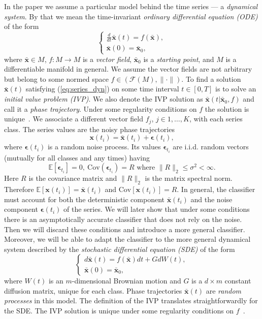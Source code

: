 \documentclass[referee, pdflatex, sn-mathphys-num]{sn-jnl}
\theoremstyle{definition}
\theoremstyle{plain}
\newcommand{\bx}{\ensuremath{\mathbf{x}}}
\newcommand{\bbx}{\ensuremath{\bar{\mathbf{x}}}}
\newcommand{\beps}{\ensuremath{\boldsymbol{\epsilon}}}
\begin{document}
	In the paper we assume a particular model behind the time series --- a \emph{dynamical system}. By that we mean the time-invariant \emph{ordinary differential equation (ODE)} of the form
	\begin{equation}\label{eq:series_dyn}
		\begin{cases}
			\frac{d}{dt} \bbx(t) = f(\bbx), \\
			\bbx(0) = \bbx_0,
		\end{cases}
	\end{equation}
	where $\bbx \in M$, $f: M \to M$ is a \textit{vector field}, $\bbx_0$ is a \textit{starting point}, and $M$ is a differentiable manifold in general. We assume the vector fields are not arbitrary but belong to some normed space $f \in (\mathcal{F}(M), \lVert \cdot \rVert)$. To find a solution $\bbx(t)$ satisfying (\ref{eq:series_dyn}) on some time interval $t \in [0, T]$ is to solve an \emph{initial value problem (IVP)}. We also denote the IVP solution as $\bbx(t | \bbx_0, f)$ and call it a \textit{phase trajectory}. Under some regularity conditions on $f$ the solution is unique~\cite{Wiggins2003}. We associate a different vector field $f_j$, $j \in 1, \ldots, K$, with each series class. The series values are the noisy phase trajectories
	\begin{equation}\label{eq:series_def}
		\bx(t_i) = \bbx(t_i) + \beps(t_i),
	\end{equation}
	where $\beps(t_i)$ is a random noise process. Its values $\beps_{t_i}$ are i.i.d. random vectors (mutually for all classes and any times) having
	\begin{equation}\label{eq:noise_conditions}
		\mathbb{E}[\beps_{t_i}] = 0, \  \text{Cov}(\beps_{t_i}) = R \text{ where } \lVert R \rVert_2 \le \sigma^2 < \infty.
	\end{equation}
	Here $R$ is the covariance matrix and $ \lVert R \rVert_2$ is the matrix spectral norm. Therefore $\mathbb{E}[\bx(t_i)] = \bbx(t_i)$ and $\text{Cov}[\bx(t_i)] = R$. In general, the classifier must account for both the deterministic component $\bbx(t_i)$ and the noise component $\beps(t_i)$ of the series. We will later show that under some conditions there is an asymptotically accurate classifier that does not rely on the noise. Then we will discard these conditions and introduce a more general classifier. Moreover, we will be able to adapt the classifier to the more general dynamical system described by the \emph{stochastic differential equation (SDE)} \cite{oksendal_sde} of the form
	\begin{equation}\label{eq:series_sde_dyn}
		\begin{cases}
			d\bbx(t) = f(\bbx)dt + G dW(t), \\
			\bbx(0) = \bbx_0,
		\end{cases}
	\end{equation}
	where $W(t)$ is an $m$-dimensional Brownian motion and $G$ is a $d \times m$ constant diffusion matrix, unique for each class. Phase trajectories $\bbx(t)$ are \emph{random processes} in this model. The definition of the IVP translates straightforwardly for the SDE. The IVP solution is unique under some regularity conditions on $f$~\cite{oksendal_sde}.
	
\end{document}
